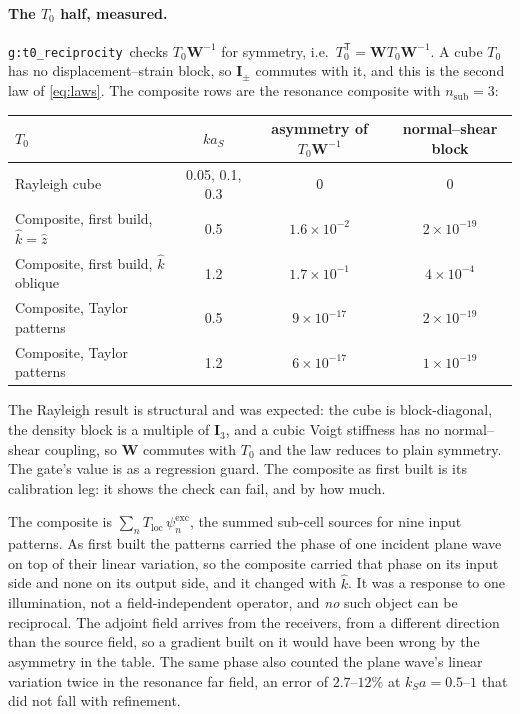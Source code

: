 \documentclass[11pt,a4paper]{article}
\newcommand{\Tz}{T_0}
\newcommand{\bW}{\mathbf{W}}
\newcommand{\bI}{\mathbf{I}}
\newcommand{\T}{\mathsf{T}}
\newcommand{\gtz}{\nolinkurl{g:t0_reciprocity}}
\begin{document}
\paragraph{The $\Tz$ half, measured.} \gtz\ checks $\Tz\bW^{-1}$ for symmetry, i.e.\
$\Tz^{\T} = \bW\Tz\bW^{-1}$. A cube $\Tz$ has no displacement--strain block, so $\mathbf{I}_{\pm}$
commutes with it, and this is the second law of \eqref{eq:laws}. The composite rows are the
resonance composite with $n_{\mathrm{sub}}=3$:

\begin{center}
\small
\setlength{\tabcolsep}{4pt}\begin{tabular}{@{}lccc@{}}
\toprule
$\Tz$ & $ka_S$ & asymmetry of $\Tz\bW^{-1}$ & normal--shear block \\
\midrule
Rayleigh cube & 0.05, 0.1, 0.3 & $0$ & $0$ \\
Composite, first build, $\hat k = \hat z$ & 0.5 & $1.6\times10^{-2}$ & $2\times10^{-19}$ \\
Composite, first build, $\hat k$ oblique & 1.2 & $1.7\times10^{-1}$ & $4\times10^{-4}$ \\
Composite, Taylor patterns & 0.5 & $9\times10^{-17}$ & $2\times10^{-19}$ \\
Composite, Taylor patterns & 1.2 & $6\times10^{-17}$ & $1\times10^{-19}$ \\
\bottomrule
\end{tabular}
\end{center}

The Rayleigh result is structural and was expected: the cube is block-diagonal, the density
block is a multiple of $\bI_3$, and a cubic Voigt stiffness has no normal--shear coupling, so
$\bW$ commutes with $\Tz$ and the law reduces to plain symmetry. The gate's value is as a
regression guard. The composite as first built is its calibration leg: it shows the check can
fail, and by how much.

The composite is $\sum_n T_{\mathrm{loc}}\,\psi^{\mathrm{exc}}_n$, the summed sub-cell sources
for nine input patterns. As first built the patterns carried the phase of one incident plane wave
on top of their linear variation, so the composite carried that phase on its input side and none
on its output side, and it changed with $\hat k$. It was a response to one illumination, not a
field-independent operator, and \emph{no} such object can be reciprocal. The adjoint field arrives
from the receivers, from a different direction than the source field, so a gradient built on it
would have been wrong by the asymmetry in the table. The same phase also counted the plane wave's
linear variation twice in the resonance far field, an error of $2.7$--$12\%$ at
$k_Sa = 0.5$--$1$ that did not fall with refinement.
\end{document}
